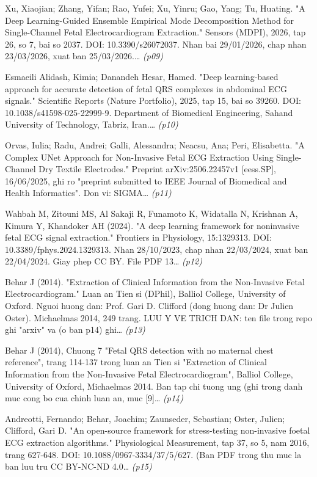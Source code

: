 \begin{enumerate}[leftmargin=1.6em,itemsep=2pt,label={[\arabic*]}]
\item {\small Xu, Xiaojian; Zhang, Yifan; Rao, Yufei; Xu, Yinru; Gao, Yang; Tu, Huating. "A Deep Learning-Guided Ensemble Empirical Mode Decomposition Method for Single-Channel Fetal Electrocardiogram Extraction." Sensors (MDPI), 2026, tap 26, so 7, bai so 2037. DOI: 10.3390/s26072037. Nhan bai 29/01/2026, chap nhan 23/03/2026, xuat ban 25/03/2026.…} \hfill{\scriptsize\itshape (p09)}
\item {\small Esmaeili Alidash, Kimia; Danandeh Hesar, Hamed. "Deep learning-based approach for accurate detection of fetal QRS complexes in abdominal ECG signals." Scientific Reports (Nature Portfolio), 2025, tap 15, bai so 39260. DOI: 10.1038/s41598-025-22999-9. Department of Biomedical Engineering, Sahand University of Technology, Tabriz, Iran.…} \hfill{\scriptsize\itshape (p10)}
\item {\small Orvas, Iulia; Radu, Andrei; Galli, Alessandra; Neacsu, Ana; Peri, Elisabetta. "A Complex UNet Approach for Non-Invasive Fetal ECG Extraction Using Single-Channel Dry Textile Electrodes." Preprint arXiv:2506.22457v1 [eess.SP], 16/06/2025, ghi ro "preprint submitted to IEEE Journal of Biomedical and Health Informatics". Don vi: SIGMA…} \hfill{\scriptsize\itshape (p11)}
\item {\small Wahbah M, Zitouni MS, Al Sakaji R, Funamoto K, Widatalla N, Krishnan A, Kimura Y, Khandoker AH (2024). "A deep learning framework for noninvasive fetal ECG signal extraction." Frontiers in Physiology, 15:1329313. DOI: 10.3389/fphys.2024.1329313. Nhan 28/10/2023, chap nhan 22/03/2024, xuat ban 22/04/2024. Giay phep CC BY. File PDF 13…} \hfill{\scriptsize\itshape (p12)}
\item {\small Behar J (2014). "Extraction of Clinical Information from the Non-Invasive Fetal Electrocardiogram." Luan an Tien si (DPhil), Balliol College, University of Oxford. Nguoi huong dan: Prof. Gari D. Clifford (dong huong dan: Dr Julien Oster). Michaelmas 2014, 249 trang. LUU Y VE TRICH DAN: ten file trong repo ghi "arxiv" va (o ban p14) ghi…} \hfill{\scriptsize\itshape (p13)}
\item {\small Behar J (2014), Chuong 7 "Fetal QRS detection with no maternal chest reference", trang 114-137 trong luan an Tien si "Extraction of Clinical Information from the Non-Invasive Fetal Electrocardiogram", Balliol College, University of Oxford, Michaelmas 2014. Ban tap chi tuong ung (ghi trong danh muc cong bo cua chinh luan an, muc [9]…} \hfill{\scriptsize\itshape (p14)}
\item {\small Andreotti, Fernando; Behar, Joachim; Zaunseder, Sebastian; Oster, Julien; Clifford, Gari D. "An open-source framework for stress-testing non-invasive foetal ECG extraction algorithms." Physiological Measurement, tap 37, so 5, nam 2016, trang 627-648. DOI: 10.1088/0967-3334/37/5/627. (Ban PDF trong thu muc la ban luu tru CC BY-NC-ND 4.0…} \hfill{\scriptsize\itshape (p15)}

\end{enumerate}

